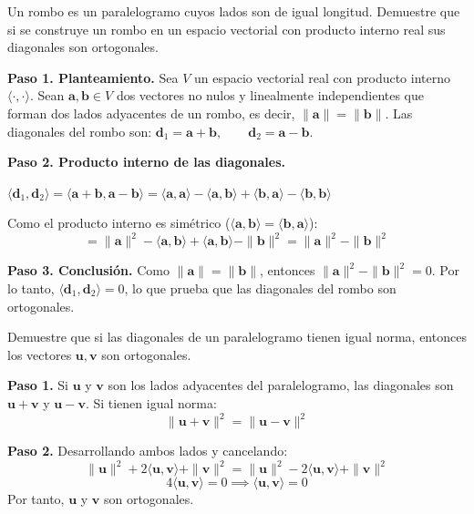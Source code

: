 
\begin{prob}
Un rombo es un paralelogramo cuyos lados son de igual longitud. Demuestre que si se construye un rombo en un espacio vectorial con producto interno real sus diagonales son ortogonales.
\begin{myproof}
\textbf{Paso 1. Planteamiento.} Sea $V$ un espacio vectorial real con producto interno $\langle \cdot, \cdot \rangle$. Sean $\mathbf{a}, \mathbf{b} \in V$ dos vectores no nulos y linealmente independientes que forman dos lados adyacentes de un rombo, es decir, $\|\mathbf{a}\| = \|\mathbf{b}\|$. Las diagonales del rombo son: \(
\mathbf{d}_1 = \mathbf{a} + \mathbf{b}, \qquad \mathbf{d}_2 = \mathbf{a} - \mathbf{b}.
\)

\textbf{Paso 2. Producto interno de las diagonales.}

\(
\langle \mathbf{d}_1, \mathbf{d}_2 \rangle = \langle \mathbf{a} + \mathbf{b}, \mathbf{a} - \mathbf{b} \rangle = \langle \mathbf{a}, \mathbf{a} \rangle - \langle \mathbf{a}, \mathbf{b} \rangle + \langle \mathbf{b}, \mathbf{a} \rangle - \langle \mathbf{b}, \mathbf{b} \rangle
\)

Como el producto interno es simétrico ($\langle \mathbf{a}, \mathbf{b} \rangle = \langle \mathbf{b}, \mathbf{a} \rangle$):
\[
= \|\mathbf{a}\|^2 - \langle \mathbf{a}, \mathbf{b} \rangle + \langle \mathbf{a}, \mathbf{b} \rangle - \|\mathbf{b}\|^2
= \|\mathbf{a}\|^2 - \|\mathbf{b}\|^2
\]

\textbf{Paso 3. Conclusión.} Como $\|\mathbf{a}\| = \|\mathbf{b}\|$, entonces $\|\mathbf{a}\|^2 - \|\mathbf{b}\|^2 = 0$. Por lo tanto, \(\langle \mathbf{d}_1, \mathbf{d}_2 \rangle = 0 \), lo que prueba que las diagonales del rombo son ortogonales.
\end{myproof}
\end{prob}

\begin{prob}
Demuestre que si las diagonales de un paralelogramo tienen igual norma, entonces los vectores \( \mathbf{u}, \mathbf{v} \) son ortogonales.
\begin{myproof}
\textbf{Paso 1.} Si $\mathbf{u}$ y $\mathbf{v}$ son los lados adyacentes del paralelogramo, las diagonales son \( \mathbf{u} + \mathbf{v} \) y \( \mathbf{u} - \mathbf{v} \). Si tienen igual norma:
\[
\|\mathbf{u} + \mathbf{v}\|^2 = \|\mathbf{u} - \mathbf{v}\|^2
\]

\textbf{Paso 2.} Desarrollando ambos lados y cancelando:
\[
\|\mathbf{u}\|^2 + 2\langle \mathbf{u}, \mathbf{v} \rangle + \|\mathbf{v}\|^2 = \|\mathbf{u}\|^2 - 2\langle \mathbf{u}, \mathbf{v} \rangle + \|\mathbf{v}\|^2
\]
\[
4\langle \mathbf{u}, \mathbf{v} \rangle = 0 \implies \langle \mathbf{u}, \mathbf{v} \rangle = 0
\]
Por tanto, $\mathbf{u}$ y $\mathbf{v}$ son ortogonales.
\end{myproof}
\end{prob}

